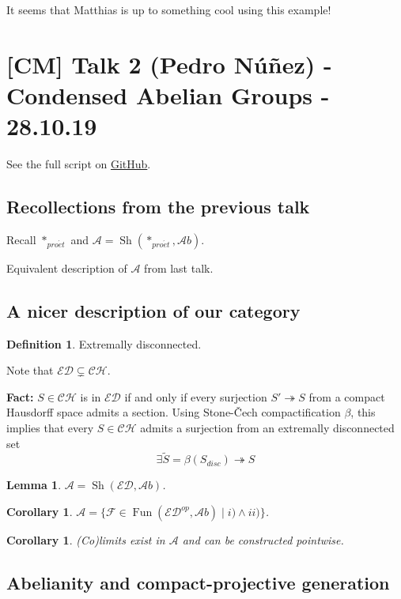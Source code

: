 \documentclass[11pt,A4]{article}
\theoremstyle{plain}
\newtheorem{lm}[thm]{Lemma}
\newtheorem{cor}[thm]{Corollary}
\theoremstyle{definition}
\newtheorem{defn}[thm]{Definition}
\theoremstyle{remark}
\newcommand{\1}{\mathbbm{1}}
\newcommand{\ED}{\mathscr{ED}}
\newcommand{\A}{\mathscr{A}}
\newcommand{\Ab}{\mathscr{A}b}
\newcommand{\F}{\mathcal{F}}
\DeclareMathOperator{\Fun}{Fun}
\DeclareMathOperator{\Sh}{Sh}
\newcommand{\pe}{*_{pro\acute et}}
\begin{document}
It seems that Matthias is up to something cool using this example!

\section{[CM] Talk 2 (Pedro Núñez) - Condensed Abelian Groups - 28.10.19}

See the full script on \href{https://github.com/pedro-nlb/cag}{GitHub}.

\subsection{Recollections from the previous talk}

Recall $\pe$ and $\A=\Sh(\pe,\Ab)$.

Equivalent description of $\A$ from last talk.

\subsection{A nicer description of our category}

\begin{defn}
    Extremally disconnected.
\end{defn}

Note that $\mathscr{ED}\subsetneq \mathscr{CH}$.

\textbf{Fact:} $S\in \mathscr{CH}$ is in $\mathscr{ED}$ if and only if every surjection $S'\twoheadrightarrow S$ from a compact Hausdorff space admits a section.
Using Stone-\v{C}ech compactification $\beta$, this implies that every $S\in \mathscr{CH}$ admits a surjection from an extremally disconnected set
\[ \exists \tilde{S}=\beta(S_{disc})\twoheadrightarrow S \]

\begin{lm}
    $\A=\Sh(\ED,\Ab)$.
\end{lm}

\begin{cor}
$\A=\{ \F\in \Fun(\ED^{op},\Ab)\mid i) \wedge ii)\}$.
\end{cor}

\begin{cor}
(Co)limits exist in $\A$ and can be constructed pointwise.
\end{cor}

\subsection{Abelianity and compact-projective generation}
\end{document}
